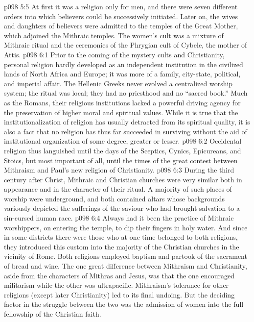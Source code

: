 \vs p098 5:5 At first it was a religion only for men, and there were seven different orders into which believers could be successively initiated. Later on, the wives and daughters of believers were admitted to the temples of the Great Mother, which adjoined the Mithraic temples. The women’s cult was a mixture of Mithraic ritual and the ceremonies of the Phrygian cult of Cybele, the mother of Attis.
\vs p098 6:1 Prior to the coming of the mystery cults and Christianity, personal religion hardly developed as an independent institution in the civilized lands of North Africa and Europe; it was more of a family, city\hyp{}state, political, and imperial affair. The Hellenic Greeks never evolved a centralized worship system; the ritual was local; they had no priesthood and no “sacred book.” Much as the Romans, their religious institutions lacked a powerful driving agency for the preservation of higher moral and spiritual values. While it is true that the institutionalization of religion has usually detracted from its spiritual quality, it is also a fact that no religion has thus far succeeded in surviving without the aid of institutional organization of some degree, greater or lesser.
\vs p098 6:2 Occidental religion thus languished until the days of the Sceptics, Cynics, Epicureans, and Stoics, but most important of all, until the times of the great contest between Mithraism and Paul’s new religion of Christianity.
\vs p098 6:3 \pc During the third century after Christ, Mithraic and Christian churches were very similar both in appearance and in the character of their ritual. A majority of such places of worship were underground, and both contained altars whose backgrounds variously depicted the sufferings of the saviour who had brought salvation to a sin\hyp{}cursed human race.
\vs p098 6:4 Always had it been the practice of Mithraic worshippers, on entering the temple, to dip their fingers in holy water. And since in some districts there were those who at one time belonged to both religions, they introduced this custom into the majority of the Christian churches in the vicinity of Rome. Both religions employed baptism and partook of the sacrament of bread and wine. The one great difference between Mithraism and Christianity, aside from the characters of Mithras and Jesus, was that the one encouraged militarism while the other was ultrapacific. Mithraism’s tolerance for other religions (except later Christianity) led to its final undoing. But the deciding factor in the struggle between the two was the admission of women into the full fellowship of the Christian faith.

